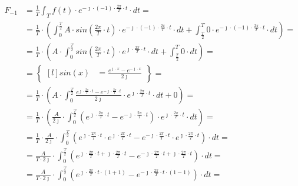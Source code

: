 \begin{task}


\begin{align*}
F_{-1}&=\frac{1}{T}\int_{T}f(t) \cdot e^{-\jmath \cdot (-1) \cdot \frac{2\pi}{T} \cdot t} \cdot dt=\\
&=\frac{1}{T}\cdot\left(\int_{0}^{\frac{T}{2}}A \cdot sin\left( \frac{2\pi}{T} \cdot t\right) \cdot e^{-\jmath \cdot (-1) \cdot \frac{2\pi}{T} \cdot t} \cdot dt+\int_{\frac{T}{2}}^{T} 0 \cdot e^{-\jmath \cdot (-1) \cdot \frac{2\pi}{T} \cdot t} \cdot dt\right)=\\
&=\frac{1}{T}\cdot\left(A \cdot \int_{0}^{\frac{T}{2}}sin\left( \frac{2\pi}{T} \cdot t\right) \cdot e^{\jmath \cdot \frac{2\pi}{T} \cdot t} \cdot dt+\int_{\frac{T}{2}}^{T} 0 \cdot dt\right)=\\
&=\begin{Bmatrix*}[l]
sin\left(x\right)&=\frac{e^{\jmath \cdot x}-e^{-\jmath \cdot x}}{2 \jmath }
\end{Bmatrix*}=\\
&=\frac{1}{T}\cdot\left(A \cdot \int_{0}^{\frac{T}{2}} \frac{e^{\jmath \cdot \frac{2\pi}{T} \cdot t}-e^{-\jmath \cdot \frac{2\pi}{T} \cdot t}}{2\jmath} \cdot e^{\jmath \cdot \frac{2\pi}{T} \cdot t} \cdot dt+0\right)=\\
&=\frac{1}{T}\cdot\left(\frac{A}{2\jmath} \cdot \int_{0}^{\frac{T}{2}} \left(e^{\jmath \cdot \frac{2\pi}{T} \cdot t}-e^{-\jmath \cdot \frac{2\pi}{T} \cdot t}\right)\cdot e^{\jmath \cdot \frac{2\pi}{T} \cdot t} \cdot dt\right)=\\
&=\frac{1}{T} \cdot \frac{A}{2\jmath} \cdot \int_{0}^{\frac{T}{2}}
\left( e^{\jmath \cdot \frac{2\pi}{T} \cdot t} \cdot e^{\jmath \cdot \frac{2\pi}{T} \cdot t} - e^{-\jmath \cdot \frac{2\pi}{T} \cdot t} \cdot e^{\jmath \cdot \frac{2\pi}{T} \cdot t} \right) \cdot dt=\\
&=\frac{A}{T\cdot 2\jmath} \cdot \int_{0}^{\frac{T}{2}}
\left(e^{\jmath \cdot \frac{2\pi}{T} \cdot t +\jmath \cdot \frac{2\pi}{T} \cdot t} - e^{-\jmath \cdot \frac{2\pi}{T} \cdot t +\jmath \cdot \frac{2\pi}{T} \cdot t} \right) \cdot dt=\\
&=\frac{A}{T\cdot 2\jmath} \cdot \int_{0}^{\frac{T}{2}}
\left(e^{\jmath \cdot \frac{2\pi}{T} \cdot t \cdot \left(1 + 1\right)} - e^{-\jmath \cdot \frac{2\pi}{T} \cdot t \cdot \left(1-1\right)} \right) \cdot dt=\\

\end{align*}
\end{task}
